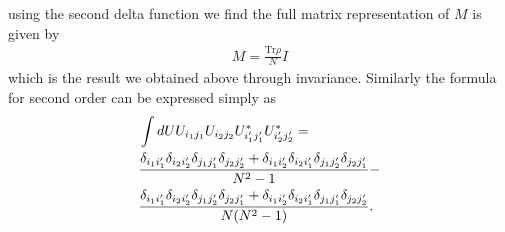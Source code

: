 \documentclass[11pt, oneside]{article}   	%
\begin{document}
using the second delta function we find the full matrix representation of $M$ is given by
\begin{align*} 
M = \frac{\mathrm{Tr} \rho}{N} I 
\end{align*}
which is the result we obtained above through invariance.  
Similarly the formula for second order can be expressed simply as
\begin{align*} 
& \int dU U_{i_1 j_1} U_{i_2 j_2} U^*_{i'_1 j'_1} U^*_{i'_2 j'_2} = \notag \\ 
& \frac{\delta_{i_1 i'_1}\delta_{i_2 i'_2}\delta_{j_1 j'_1} \delta_{j_2 j'_2} + \delta_{i_1 i'_2}\delta_{i_2 i'_1}\delta_{j_1 j'_2} \delta_{j_2 j'_1}}{N^2 - 1} - \notag \\ 
& \frac{\delta_{i_1 i'_1}\delta_{i_2 i'_2}\delta_{j_1 j'_2} \delta_{j_2 j'_1} + \delta_{i_1 i'_2}\delta_{i_2 i'_1}\delta_{j_1 j'_1} \delta_{j_2 j'_2}}{N (N^2 - 1)}. 
\end{align*}


\end{document}
